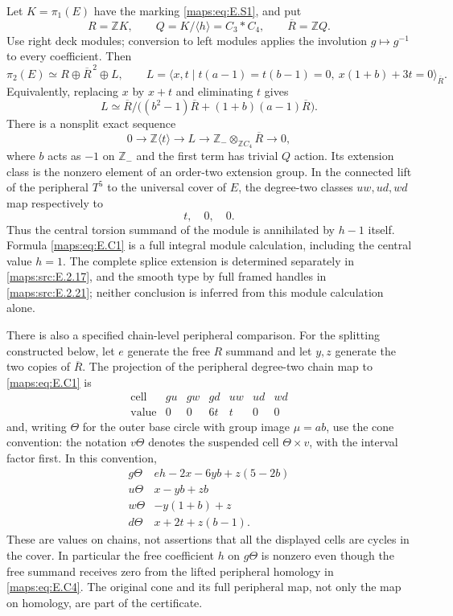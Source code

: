 

Let $K=\pi_1(E)$ have the marking \eqref{maps:eq:E.S1}, and put
\[
 R=\mathbb ZK,\qquad Q=K/\langle h\rangle=C_3*C_4,
 \qquad \overline R=\mathbb ZQ.
\]
Use right deck modules; conversion to left modules applies the
involution $g\mapsto g^{-1}$ to every coefficient. Then
\[
 \pi_2(E)\simeq R\oplus\overline R^{\,2}\oplus L,
 \qquad
 L=\langle x,t\mid t(a-1)=t(b-1)=0,
                         \ x(1+b)+3t=0\rangle_{\overline R}.
 \tag{E.C1}\label{maps:eq:E.C1}
\]
Equivalently, replacing $x$ by $x+t$ and eliminating $t$ gives
\[
 L\simeq\overline R\big/
       \big((b^2-1)\overline R+(1+b)(a-1)\overline R\big).
 \tag{E.C2}\label{maps:eq:E.C2}
\]
There is a nonsplit exact sequence
\[
 0\longrightarrow\mathbb Z\langle t\rangle
  \longrightarrow L\longrightarrow
  \mathbb Z_{-}\otimes_{\mathbb ZC_4}\overline R
  \longrightarrow0,
 \tag{E.C3}\label{maps:eq:E.C3}
\]
where $b$ acts as $-1$ on $\mathbb Z_{-}$ and the first term
has trivial $Q$ action. Its extension class is the nonzero
element of an order-two extension group. In the connected
lift of the peripheral $T^5$ to the universal cover of $E$,
the degree-two classes $uw,ud,wd$ map respectively to
\[
                           t,\quad0,\quad0.
 \tag{E.C4}\label{maps:eq:E.C4}
\]
Thus the central torsion summand of the module is annihilated
by $h-1$ itself. Formula \eqref{maps:eq:E.C1} is a full integral module
calculation, including the central value $h=1$.  The complete
splice extension is determined separately in \ref{maps:src:E.2.17}, and the
smooth type by full framed handles in \ref{maps:src:E.2.21}; neither conclusion
is inferred from this module calculation alone.

There is also a specified chain-level peripheral comparison.
For the splitting constructed below, let $e$ generate the
free $R$ summand and let $y,z$ generate the two copies of
$\overline R$. The projection of the peripheral degree-two
chain map to \eqref{maps:eq:E.C1} is
\[
 \begin{array}{c|rrrrrr}
 \text{cell}&gu&gw&gd&uw&ud&wd\\ \hline
 \text{value}&0&0&6t&t&0&0
 \end{array}
 \tag{E.C19a}\label{maps:eq:E.C19a}
\]
and, writing $\Theta$ for the outer base circle with
group image $\mu=ab$, use the cone convention: the
notation $v\Theta$ denotes the suspended cell
$\Theta\times v$, with the interval factor first.
In this convention,
\[
 \begin{array}{c|l}
  g\Theta&eh-2x-6yb+z(5-2b)\\
  u\Theta&x-yb+zb\\
  w\Theta&-y(1+b)+z\\
  d\Theta&x+2t+z(b-1).
 \end{array}
 \tag{E.C19b}\label{maps:eq:E.C19b}
\]
These are values on chains, not assertions that all
the displayed cells are cycles in the cover. In
particular the free coefficient $h$ on $g\Theta$
is nonzero even though the free summand receives
zero from the lifted peripheral homology in \eqref{maps:eq:E.C4}.
The original cone and its full peripheral map, not
only the map on homology, are part of the certificate.

